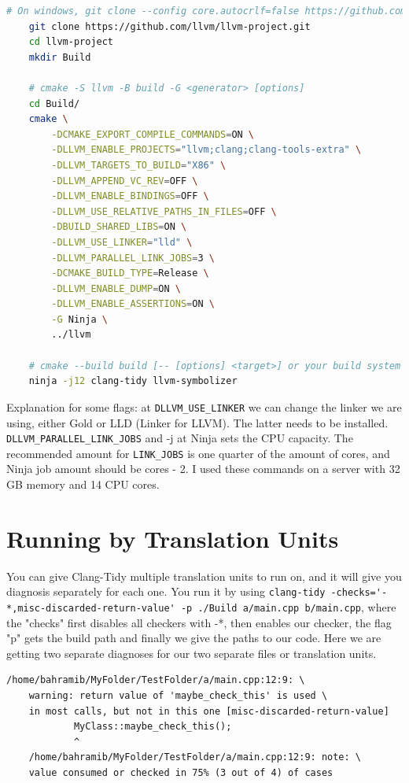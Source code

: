 \begin{lstlisting}[language={bash}]
	# On windows, git clone --config core.autocrlf=false https://github.com/llvm/llvm-project.git
	git clone https://github.com/llvm/llvm-project.git
	cd llvm-project
	mkdir Build

	# cmake -S llvm -B build -G <generator> [options]
	cd Build/
	cmake \
		-DCMAKE_EXPORT_COMPILE_COMMANDS=ON \
		-DLLVM_ENABLE_PROJECTS="llvm;clang;clang-tools-extra" \
		-DLLVM_TARGETS_TO_BUILD="X86" \
		-DLLVM_APPEND_VC_REV=OFF \
		-DLLVM_ENABLE_BINDINGS=OFF \
		-DLLVM_USE_RELATIVE_PATHS_IN_FILES=OFF \
		-DBUILD_SHARED_LIBS=ON \
		-DLLVM_USE_LINKER="lld" \
		-DLLVM_PARALLEL_LINK_JOBS=3 \
		-DCMAKE_BUILD_TYPE=Release \
		-DLLVM_ENABLE_DUMP=ON \
		-DLLVM_ENABLE_ASSERTIONS=ON \
		-G Ninja \
		../llvm
	
	# cmake --build build [-- [options] <target>] or your build system specified above directly.
	ninja -j12 clang-tidy llvm-symbolizer
\end{lstlisting}

Explanation for some flags: at \texttt{DLLVM\_USE\_LINKER} we can change the linker we are using, either Gold or LLD (Linker for LLVM). The
latter needs to be installed. \texttt{DLLVM\_PARALLEL\_LINK\_JOBS} and -j at Ninja sets the CPU capacity. The recommended amount for
\texttt{LINK\_JOBS} is one quarter of the amount of cores, and Ninja job amount should be cores - 2. I used these commands on a
server with 32 GB memory and 14 CPU cores.


\section{Running by Translation Units}
\label{by TU}

You can give Clang-Tidy multiple translation units to run on, and it will give you diagnosis separately for each one. You run it by
using \lstinline{clang-tidy -checks='-*,misc-discarded-return-value' -p ./Build a/main.cpp b/main.cpp},
where the "checks" first disables all checkers with -*, then enables our checker, the flag "p" gets the build path and finally
we give the paths to our code. Here we are getting two separate diagnoses for our two separate files or translation units.

\begin{lstlisting}[caption={Diagnosis output without project level knowledge},captionpos=b]
	/home/bahramib/MyFolder/TestFolder/a/main.cpp:12:9: \
	warning: return value of 'maybe_check_this' is used \
	in most calls, but not in this one [misc-discarded-return-value]
			MyClass::maybe_check_this();
			^
	/home/bahramib/MyFolder/TestFolder/a/main.cpp:12:9: note: \
	value consumed or checked in 75% (3 out of 4) of cases
\end{lstlisting}

